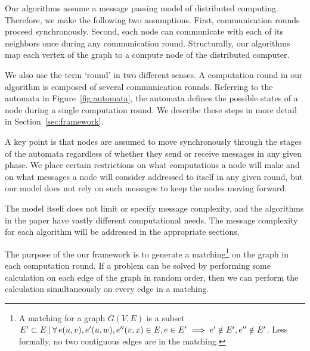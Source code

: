Our algorithms assume a message passing model of distributed computing. Therefore, we make the following two assumptions. First, communication rounds proceed synchronously. Second, each node can communicate with each of its neighbors once during any communication round. Structurally, our algorithms map each vertex of the graph to a compute node of the distributed computer. 

We also use the term `round' in two different senses. A computation round in our algorithm is composed of several communication rounds. Referring to the automata in Figure~\ref{fig:automata}, the automata defines the possible states of a node during a single computation round. We describe these steps in more detail in Section~\ref{sec:framework}.

A key point is that nodes are assumed to move synchronously through the stages of the automata regardless of whether they send or receive messages in any given phase. We place certain restrictions on what computations a node will make and on what messages a node will consider addressed to itself in any given round, but our model does not rely on such messages to keep the nodes moving forward.

The model itself does not limit or specify message complexity, and the algorithms in the paper have vastly different computational needs. The message complexity for each algorithm will be addressed in the appropriate sections.

The purpose of the our framework is to generate a matching\footnote{A matching for a graph $G(V,E)$ is a subset $E' \subset E {\: |\:} \forall\, e(u,v), e'(u,w), e''(v,x) \in E, e \in E' \implies e' \notin E', e'' \notin E'$. Less formally, no two contiguous edges are in the matching.} on the graph in each computation round. If a problem can be solved by performing some calculation on each edge of the graph in random order, then we can perform the calculation simultaneously on every edge in a matching.  
